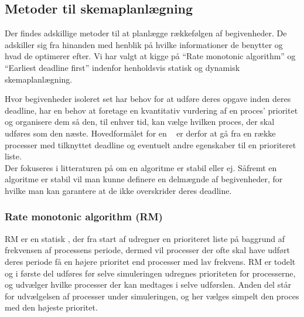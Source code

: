 
\subsection{Metoder til skemaplanlægning}
Der findes adskillige metoder til at planlægge rækkefølgen af begivenheder. De adskiller sig fra hinanden med henblik på hvilke informationer de benytter og hvad de optimerer efter. Vi har valgt at kigge på ``Rate monotonic algorithm''\cite{lehoczky1989rate,liu1973scheduling} og ``Earliest deadline first''\cite{liu1973scheduling} indenfor henholdsvis statisk og dynamisk skemaplanlægning.

Hvor begivenheder isoleret set har behov for at udføre deres opgave inden deres deadline, har \sched en behov at foretage en kvantitativ vurdering af en proces' prioritet og organisere dem så den, til enhver tid, kan vælge hvilken proces, der skal udføres som den næste. Hovedformålet for en  \sched ~ er derfor at gå fra en række processer med tilknyttet deadline og eventuelt andre egenskaber til en prioriteret liste. \\
Der fokuseres i litteraturen på om en algoritme er stabil eller ej. Såfremt en algoritme er stabil vil man kunne definere en delmægnde af begivenheder, for hvilke man kan garantere at de ikke overskrider deres deadline. 

\subsubsection{Rate monotonic algorithm (RM)}
RM er en statisk \sched, der fra start af udregner en prioriteret liste på baggrund af frekvensen af processens periode, dermed vil processer der ofte skal have udført deres periode få en højere prioritet end processer med lav frekvens. RM er todelt og i første del udføres før selve simuleringen udregnes  prioriteten for processerne, og udvælger hvilke processer der kan medtages i selve udførslen. Anden del står for udvælgelsen af processer  under simuleringen, og her vælges simpelt den proces med den højeste prioritet. 

